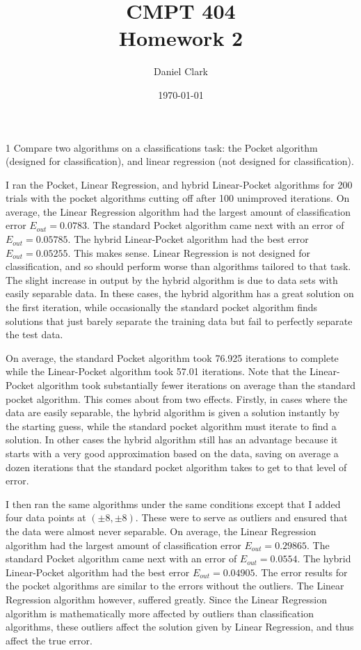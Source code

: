 \documentclass[12pt]{article}
\title{CMPT 404\\Homework 2}
\author{Daniel Clark}
\date{\today}
\begin{document}
\maketitle

\begin{description} 
\begin{doublespace}


\item[1] Compare two algorithms on a classifications task: the Pocket algorithm (designed for classification), and linear regression (not designed for classification).

I ran the Pocket, Linear Regression, and hybrid Linear-Pocket algorithms for 200 trials with the pocket algorithms cutting off after 100 unimproved iterations. On average, the Linear Regression algorithm had the largest amount of classification error $E_{out} = 0.0783$. The standard Pocket algorithm came next with an error of $E_{out} = 0.05785$. The hybrid Linear-Pocket algorithm had the best error $E_{out} = 0.05255$. This makes sense. Linear Regression is not designed for classification, and so should perform worse than algorithms tailored to that task. The slight increase in output by the hybrid algorithm is due to data sets with easily separable data. In these cases, the hybrid algorithm has a great solution on the first iteration, while occasionally the standard pocket algorithm finds solutions that just barely separate the training data but fail to perfectly separate the test data.

On average, the standard Pocket algorithm took 76.925 iterations to complete while the Linear-Pocket algorithm took 57.01 iterations. Note that the Linear-Pocket algorithm took substantially fewer iterations on average than the standard pocket algorithm. This comes about from two effects. Firstly, in cases where the data are easily separable, the hybrid algorithm is given a solution instantly by the starting guess, while the standard pocket algorithm must iterate to find a solution. In other cases the hybrid algorithm still has an advantage because it starts with a very good approximation based on the data, saving on average a dozen iterations that the standard pocket algorithm takes to get to that level of error.


I then ran the same algorithms under the same conditions except that I added four data points at $(\pm8, \pm8)$. These were to serve as outliers and ensured that the data were almost never separable. On average, the Linear Regression algorithm had the largest amount of classification error $E_{out} = 0.29865$. The standard Pocket algorithm came next with an error of $E_{out} = 0.0554$. The hybrid Linear-Pocket algorithm had the best error $E_{out} = 0.04905$. The error results for the pocket algorithms are similar to the errors without the outliers. The Linear Regression algorithm however, suffered greatly. Since the Linear Regression algorithm is mathematically more affected by outliers than classification algorithms, these outliers affect the solution given by Linear Regression, and thus affect the true error.


\end{doublespace}
\end{description}
\end{document}
